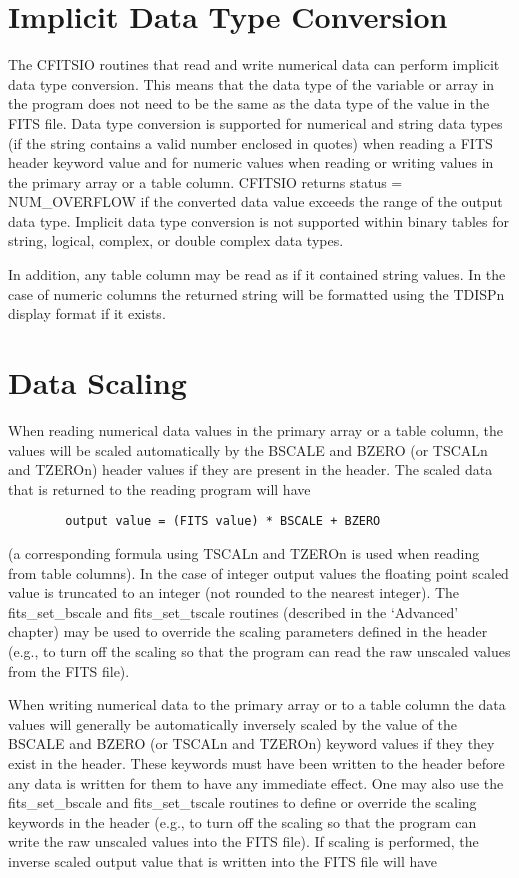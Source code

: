 \documentclass[11pt]{book}
\begin{document}
\section{Implicit Data Type Conversion}

The CFITSIO routines that read and write numerical data can perform
implicit data type conversion.  This means that the data type of the
variable or array in the program does not need to be the same as the
data type of the value in the FITS file.  Data type conversion is
supported for numerical and string data types (if the string contains a
valid number enclosed in quotes) when reading a FITS header keyword
value and for numeric values when reading or writing values in the
primary array or a table column.  CFITSIO returns status =
NUM\_OVERFLOW  if the converted data value exceeds the range of the
output data type.  Implicit data type conversion is not supported
within binary tables for string, logical, complex, or double complex
data types.

In addition, any table column may be read as if it contained string values.
In the case of numeric columns the returned string will be formatted
using the TDISPn display format if it exists.


\section{Data Scaling}

When reading numerical data values in the primary array or a
table column, the values will be scaled automatically by the BSCALE and
BZERO (or TSCALn and TZEROn) header values if they are
present in the header.  The scaled data that is returned to the reading
program will have

\begin{verbatim}
        output value = (FITS value) * BSCALE + BZERO
\end{verbatim}
(a corresponding formula using TSCALn and TZEROn is used when reading
from table columns).  In the case of integer output values the floating
point scaled value is truncated to an integer (not rounded to the
nearest integer).  The fits\_set\_bscale and fits\_set\_tscale routines
(described in the `Advanced' chapter) may be used to override the
scaling parameters defined in the header (e.g., to turn off the scaling
so that the program can read the raw unscaled values from the FITS
file).

When writing numerical data to the primary array or to a table column
the data values will generally be automatically inversely scaled by the
value of the BSCALE and BZERO (or TSCALn and TZEROn) keyword values if
they they exist in the header.  These keywords must have been written
to the header before any data is written for them to have any immediate
effect.  One may also use the fits\_set\_bscale and fits\_set\_tscale
routines to define or override the scaling keywords in the header
(e.g., to turn off the scaling so that the program can write the raw
unscaled values into the FITS file). If scaling is performed, the
inverse scaled output value that is written into the FITS file will
have
\end{document}
